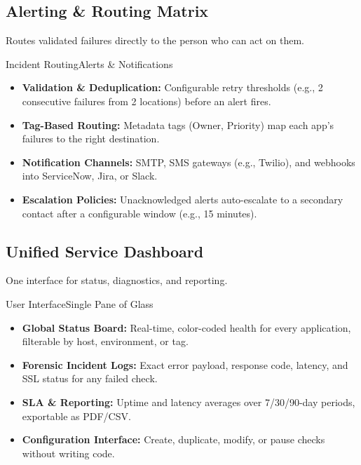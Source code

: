 \documentclass[11pt,a4paper]{article}
\begin{document}
\subsection{Alerting \& Routing Matrix}
Routes validated failures directly to the person who can act on them.

\begin{recbox}{Incident Routing}{Alerts \& Notifications}
\begin{itemize}
  \item \textbf{Validation \& Deduplication:} Configurable retry thresholds (e.g., 2 consecutive failures from 2 locations) before an alert fires.
  \item \textbf{Tag-Based Routing:} Metadata tags (Owner, Priority) map each app's failures to the right destination.
  \item \textbf{Notification Channels:} SMTP, SMS gateways (e.g., Twilio), and webhooks into ServiceNow, Jira, or Slack.
  \item \textbf{Escalation Policies:} Unacknowledged alerts auto-escalate to a secondary contact after a configurable window (e.g., 15 minutes).
\end{itemize}
\end{recbox}

\subsection{Unified Service Dashboard}
One interface for status, diagnostics, and reporting.

\begin{recbox}{User Interface}{Single Pane of Glass}
\begin{itemize}
  \item \textbf{Global Status Board:} Real-time, color-coded health for every application, filterable by host, environment, or tag.
  \item \textbf{Forensic Incident Logs:} Exact error payload, response code, latency, and SSL status for any failed check.
  \item \textbf{SLA \& Reporting:} Uptime and latency averages over 7/30/90-day periods, exportable as PDF/CSV.
  \item \textbf{Configuration Interface:} Create, duplicate, modify, or pause checks without writing code.
\end{itemize}
\end{recbox}
\end{document}
